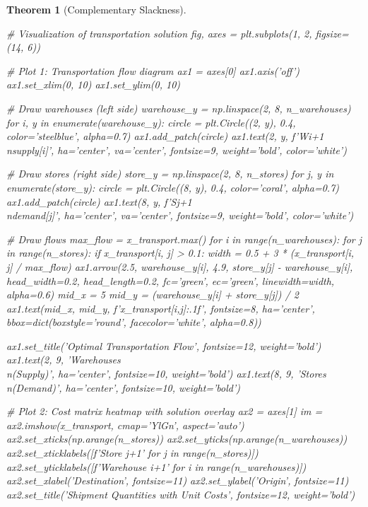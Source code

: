 \documentclass[a4paper, 11pt]{article}
\newtheorem{theorem}{Theorem}[section]
\begin{document}
\begin{theorem}[Complementary Slackness]
\begin{pycode}
# Visualization of transportation solution
fig, axes = plt.subplots(1, 2, figsize=(14, 6))

# Plot 1: Transportation flow diagram
ax1 = axes[0]
ax1.axis('off')
ax1.set_xlim(0, 10)
ax1.set_ylim(0, 10)

# Draw warehouses (left side)
warehouse_y = np.linspace(2, 8, n_warehouses)
for i, y in enumerate(warehouse_y):
    circle = plt.Circle((2, y), 0.4, color='steelblue', alpha=0.7)
    ax1.add_patch(circle)
    ax1.text(2, y, f'W{i+1}\\n{supply[i]}', ha='center', va='center',
            fontsize=9, weight='bold', color='white')

# Draw stores (right side)
store_y = np.linspace(2, 8, n_stores)
for j, y in enumerate(store_y):
    circle = plt.Circle((8, y), 0.4, color='coral', alpha=0.7)
    ax1.add_patch(circle)
    ax1.text(8, y, f'S{j+1}\\n{demand[j]}', ha='center', va='center',
            fontsize=9, weight='bold', color='white')

# Draw flows
max_flow = x_transport.max()
for i in range(n_warehouses):
    for j in range(n_stores):
        if x_transport[i, j] > 0.1:
            width = 0.5 + 3 * (x_transport[i, j] / max_flow)
            ax1.arrow(2.5, warehouse_y[i], 4.9, store_y[j] - warehouse_y[i],
                     head_width=0.2, head_length=0.2, fc='green', ec='green',
                     linewidth=width, alpha=0.6)
            mid_x = 5
            mid_y = (warehouse_y[i] + store_y[j]) / 2
            ax1.text(mid_x, mid_y, f'{x_transport[i,j]:.1f}',
                    fontsize=8, ha='center',
                    bbox=dict(boxstyle='round', facecolor='white', alpha=0.8))

ax1.set_title('Optimal Transportation Flow', fontsize=12, weight='bold')
ax1.text(2, 9, 'Warehouses\\n(Supply)', ha='center', fontsize=10, weight='bold')
ax1.text(8, 9, 'Stores\\n(Demand)', ha='center', fontsize=10, weight='bold')

# Plot 2: Cost matrix heatmap with solution overlay
ax2 = axes[1]
im = ax2.imshow(x_transport, cmap='YlGn', aspect='auto')
ax2.set_xticks(np.arange(n_stores))
ax2.set_yticks(np.arange(n_warehouses))
ax2.set_xticklabels([f'Store {j+1}' for j in range(n_stores)])
ax2.set_yticklabels([f'Warehouse {i+1}' for i in range(n_warehouses)])
ax2.set_xlabel('Destination', fontsize=11)
ax2.set_ylabel('Origin', fontsize=11)
ax2.set_title('Shipment Quantities with Unit Costs', fontsize=12, weight='bold')


\end{pycode}
\end{theorem}
\end{document}
